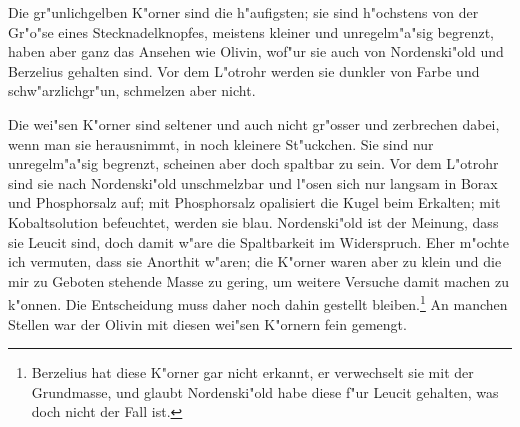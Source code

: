 \documentclass[a4paper, 11pt, oneside, german]{article}
\begin{document}
Die gr"unlichgelben K"orner sind die h"aufigsten; sie sind h"ochstens von der Gr"o"se eines Stecknadelknopfes, meistens kleiner und unregelm"a"sig begrenzt, haben aber ganz das Ansehen wie Olivin, wof"ur sie auch von Nordenski"old und Berzelius gehalten sind. Vor dem L"otrohr werden sie dunkler von Farbe und schw"arzlichgr"un, schmelzen aber nicht.

Die wei"sen K"orner sind seltener und auch nicht gr"osser und zerbrechen dabei, wenn man sie herausnimmt, in noch kleinere St"uckchen. Sie sind nur unregelm"a"sig begrenzt, scheinen aber doch spaltbar zu sein. Vor dem L"otrohr sind sie nach Nordenski"old unschmelzbar und l"osen sich nur langsam in Borax und Phosphorsalz auf; mit Phosphorsalz opalisiert die Kugel beim Erkalten; mit Kobaltsolution befeuchtet, werden sie blau. Nordenski"old ist der Meinung, dass sie Leucit sind, doch damit w"are die Spaltbarkeit im Widerspruch. Eher m"ochte ich vermuten, dass sie Anorthit w"aren; die K"orner waren aber zu klein und die mir zu Geboten stehende Masse zu gering, um weitere Versuche damit machen zu k"onnen. Die Entscheidung muss daher noch dahin gestellt bleiben.\footnote{Berzelius hat diese K"orner gar nicht erkannt, er verwechselt sie mit der Grundmasse, und glaubt Nordenski"old habe diese f"ur Leucit gehalten, was doch nicht der Fall ist.} An manchen Stellen war der Olivin mit diesen wei"sen K"ornern fein gemengt.
\end{document}
